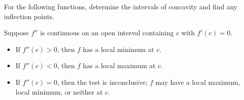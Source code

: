 \documentclass[../mathNotesPreamble]{subfiles}
\begin{document}
  \begin{ex*}
    For the following functions, determine the intervals of concavity and find any inflection points.
  \end{ex*}
  \pagebreak

  \begin{thmBox*}
    Suppose $f''$ is continuous on an open interval containing $c$ with $f'(c)=0$.
    \begin{itemize}
      \item If $f''(c)>0$, then $f$ has a local minimum at $c$.
      \item If $f''(c)<0$, then $f$ has a local maximum at $c$.
      \item If $f''(c)=0$, then the test is inconclusive; $f$ may have a local maximum, local minimum, or neither at $c$.
    \end{itemize}
  \end{thmBox*}
  \pagebreak
\end{document}
